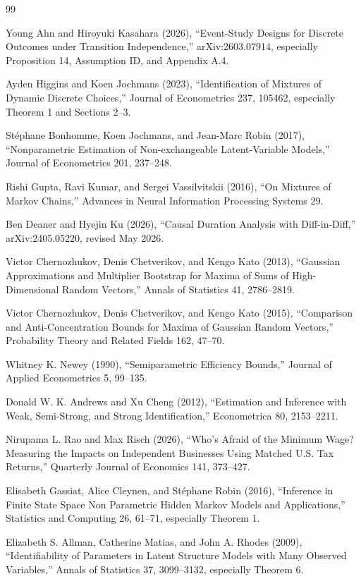 \documentclass{article}
\begin{document}
\begin{thebibliography}{99}

   Young Ahn and Hiroyuki Kasahara (2026), ``Event-Study Designs for Discrete Outcomes under Transition Independence,'' arXiv:2603.07914, especially Proposition 14, Assumption ID, and Appendix A.4.

   Ayden Higgins and Koen Jochmans (2023), ``Identification of Mixtures of Dynamic Discrete Choices,'' Journal of Econometrics 237, 105462, especially Theorem 1 and Sections 2--3.

   Stéphane Bonhomme, Koen Jochmans, and Jean-Marc Robin (2017), ``Nonparametric Estimation of Non-exchangeable Latent-Variable Models,'' Journal of Econometrics 201, 237--248.

   Rishi Gupta, Ravi Kumar, and Sergei Vassilvitskii (2016), ``On Mixtures of Markov Chains,'' Advances in Neural Information Processing Systems 29.

   Ben Deaner and Hyejin Ku (2026), ``Causal Duration Analysis with Diff-in-Diff,'' arXiv:2405.05220, revised May 2026.

   Victor Chernozhukov, Denis Chetverikov, and Kengo Kato (2013), ``Gaussian Approximations and Multiplier Bootstrap for Maxima of Sums of High-Dimensional Random Vectors,'' Annals of Statistics 41, 2786--2819.

   Victor Chernozhukov, Denis Chetverikov, and Kengo Kato (2015), ``Comparison and Anti-Concentration Bounds for Maxima of Gaussian Random Vectors,'' Probability Theory and Related Fields 162, 47--70.

   Whitney K. Newey (1990), ``Semiparametric Efficiency Bounds,'' Journal of Applied Econometrics 5, 99--135.

   Donald W. K. Andrews and Xu Cheng (2012), ``Estimation and Inference with Weak, Semi-Strong, and Strong Identification,'' Econometrica 80, 2153--2211.

   Nirupama L. Rao and Max Risch (2026), ``Who's Afraid of the Minimum Wage? Measuring the Impacts on Independent Businesses Using Matched U.S. Tax Returns,'' Quarterly Journal of Economics 141, 373--427.

   Elisabeth Gassiat, Alice Cleynen, and Stéphane Robin (2016), ``Inference in Finite State Space Non Parametric Hidden Markov Models and Applications,'' Statistics and Computing 26, 61--71, especially Theorem 1.

   Elizabeth S. Allman, Catherine Matias, and John A. Rhodes (2009), ``Identifiability of Parameters in Latent Structure Models with Many Observed Variables,'' Annals of Statistics 37, 3099--3132, especially Theorem 6.

\end{thebibliography}
\end{document}

